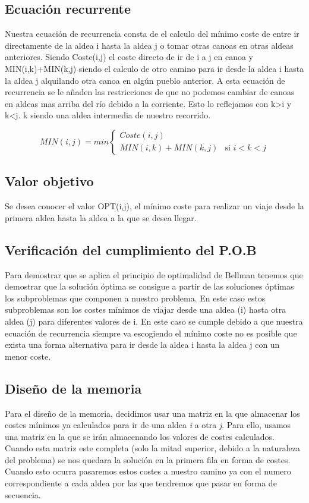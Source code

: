 \subsection{Ecuación recurrente}
Nuestra ecuación de recurrencia consta de el calculo del mínimo coste de entre  ir directamente de la aldea i hasta la aldea j  o tomar otras canoas en otras aldeas anteriores.
Siendo Coste(i,j) el coste directo de ir de i a j en canoa y MIN(i,k)+MIN(k,j)  siendo el calculo de otro camino para ir desde la aldea i hasta la aldea j alquilando otra canoa en algún pueblo anterior.
A esta ecuación de recurrencia se le añaden las restricciones de que no podemos cambiar de canoas en aldeas mas arriba del río debido a la corriente. Esto lo reflejamos con k>i y k<j. k siendo una aldea intermedia de nuestro recorrido.

\[ MIN(i, j) = min
  \left \{
    \begin{aligned}
      Coste (i, j)\\
      MIN(i, k) + MIN(k, j)    & \text{si } i<k<j
    \end{aligned}
  \right .
\]

 
\subsection{Valor objetivo}
Se desea conocer el valor OPT(i,j), el mínimo coste para realizar un viaje desde la primera aldea hasta la aldea a la que se desea llegar. 

\subsection{Verificación del cumplimiento del P.O.B}
Para demostrar que se aplica el principio de optimalidad de Bellman tenemos que demostrar que la solución óptima se consigue a partir de las soluciones óptimas los subproblemas que componen a nuestro problema. En este caso estos subproblemas son los costes mínimos de viajar desde una aldea (i) hasta otra aldea (j) para diferentes valores de i.
En este caso se cumple debido a que nuestra ecuación de recurrencia siempre va escogiendo el mínimo coste no es posible que exista una forma alternativa para ir desde la aldea i hasta la aldea j con un menor coste.

\subsection{Diseño de la memoria} 
Para el diseño de la memoria, decidimos usar una matriz en la que almacenar los costes mínimos ya calculados para ir de una aldea \textit{i} a otra \textit{j}. 
Para ello, usamos una matriz en la que se irán almacenando los valores de costes calculados. Cuando esta matriz este completa (solo la mitad superior, debido a la naturaleza del problema) se nos quedara la solución en la primera fila en forma de costes.
Cuando esto ocurra pasaremos estos costes a nuestro camino ya con el numero correspondiente a cada aldea por las que tendremos que pasar en forma de secuencia.
